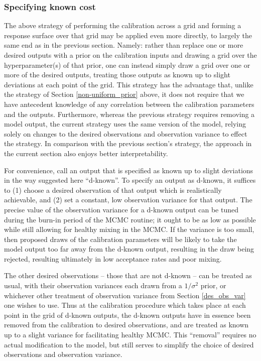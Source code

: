 \documentclass{article}
\begin{document}
\subsubsection{Specifying known cost}\label{known_cost}

The above strategy of performing the calibration across a grid and forming a response surface over that grid may be applied even more directly, to largely the same end as in the previous section. Namely: rather than replace one or more desired outputs with a prior on the calibration inputs and drawing a grid over the hyperparameter(s) of that prior, one can instead simply draw a grid over one or more of the desired outputs, treating those outputs as known up to slight deviations at each point of the grid. This strategy has the advantage that, unlike the strategy of Section \ref{non-uniform_prior} above, it does not require that we have antecedent knowledge of any correlation between the calibration parameters and the outputs. Furthermore, whereas the previous strategy requires removing a model output, the current strategy uses the same version of the model, relying solely on changes to the desired observations and observation variance to effect the strategy. In comparison with the previous section's strategy, the approach in the current section also enjoys better interpretability.

For convenience, call an output that is specified as known up to slight deviations in the way suggested here ``d-known''. To specify an output as d-known, it suffices to (1) choose a desired observation of that output which is realistically achievable, and (2) set a constant, low observation variance for that output. The precise value of the observation variance for a d-known output can be tuned during the burn-in period of the MCMC routine; it ought to be as low as possible while still allowing for healthy mixing in the MCMC. If the variance is too small, then proposed draws of the calibration parameters will be likely to take the model output too far away from the d-known output, resulting in the draw being rejected, resulting ultimately in low acceptance rates and poor mixing.

The other desired observations -- those that are not d-known -- can be treated as usual, with their observation variances each drawn from a $1/\sigma^2$ prior, or whichever other treatment of observation variance from Section \ref{des_obs_var} one wishes to use. Thus at the calibration procedure which takes place at each point in the grid of d-known outputs, the d-known outputs have in essence been removed from the calibration to desired observations, and are treated as known up to a slight variance for facilitating healthy MCMC. This ``removal'' requires no actual modification to the model, but still serves to simplify the choice of desired observations and observation variance.
\end{document}
